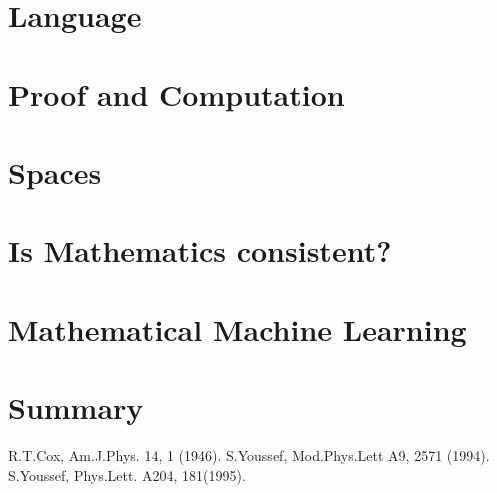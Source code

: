 \documentclass[11pt]{article}
\begin{document}
\section{Language}

\section{Proof and Computation}
\section{Spaces}
\section{Is Mathematics consistent?}
\section{Mathematical Machine Learning}
\section{Summary} 


\begin{thebibliography}{10}
 R.T.Cox, Am.J.Phys. 14, 1 (1946).
 S.Youssef, Mod.Phys.Lett A9, 2571 (1994).
 S.Youssef, Phys.Lett. A204, 181(1995).

\end{thebibliography}
\end{document}
